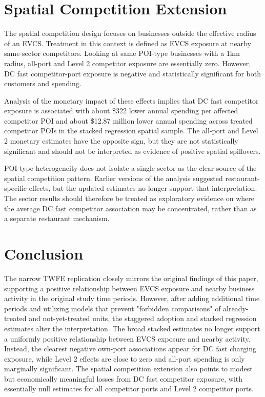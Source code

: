\documentclass[12pt]{article}
\begin{document}
\FloatBarrier

\section{Spatial Competition Extension}

The spatial competition design focuses on businesses outside the effective radius of an EVCS. Treatment in this context is defined as EVCS exposure at nearby same-sector competitors. Looking at same POI-type businesses with a 1km radius, all-port and Level 2 competitor exposure are essentially zero. However, DC fast competitor-port exposure is negative and statistically significant for both customers and spending.

Analysis of the monetary impact of these effects implies that DC fast competitor exposure is associated with about \$322 lower annual spending per affected competitor POI and about \$12.87 million lower annual spending across treated competitor POIs in the stacked regression spatial sample. The all-port and Level 2 monetary estimates have the opposite sign, but they are not statistically significant and should not be interpreted as evidence of positive spatial spillovers.

POI-type heterogeneity does not isolate a single sector as the clear source of the spatial competition pattern. Earlier versions of the analysis suggested restaurant-specific effects, but the updated estimates no longer support that interpretation. The sector results should therefore be treated as exploratory evidence on where the average DC fast competitor association may be concentrated, rather than as a separate restaurant mechanism.







\section{Conclusion}

The narrow TWFE replication closely mirrors the original findings of this paper, supporting a positive relationship between EVCS exposure and nearby business activity in the original study time periods. However, after adding additional time periods and utilizing models that prevent "forbidden comparisons" of already-treated and not-yet-treated units, the staggered adoption and stacked regression estimates alter the interpretation. The broad stacked estimates no longer support a uniformly positive relationship between EVCS exposure and nearby activity. Instead, the clearest negative own-port associations appear for DC fast charging exposure, while Level 2 effects are close to zero and all-port spending is only marginally significant. The spatial competition extension also points to modest but economically meaningful losses from DC fast competitor exposure, with essentially null estimates for all competitor ports and Level 2 competitor ports.
\end{document}
